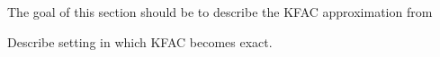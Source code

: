 The goal of this section should be to describe the KFAC approximation from~\cite{martens2015optimizing}
\begin{test}[KFAC]
  Describe setting in which KFAC becomes exact.
\end{test}


